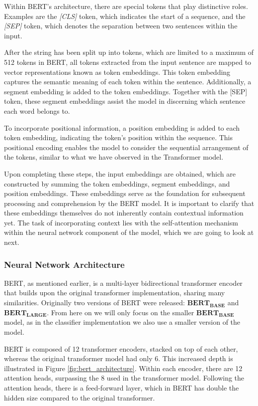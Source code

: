 \documentclass[a4paper,10pt]{report}
\begin{document}
Within BERT's architecture, there are special tokens that play distinctive roles. Examples are the \textit{[CLS]} token, which indicates the start of a sequence, and the \textit{[SEP]} token, which denotes the separation between two sentences within the input.

After the string has been split up into tokens, which are limited to a maximum of 512 tokens in BERT, all tokens extracted from the input sentence are mapped to vector representations known as token embeddings. This token embedding captures the semantic meaning of each token within the sentence. Additionally, a segment embedding is added to the token embeddings. Together with the [SEP] token, these segment embeddings assist the model in discerning which sentence each word belongs to.

To incorporate positional information, a position embedding is added to each token embedding, indicating the token's position within the sequence. This positional encoding enables the model to consider the sequential arrangement of the tokens, similar to what we have observed in the Transformer model.

Upon completing these steps, the input embeddings are obtained, which are constructed by summing the token embeddings, segment embeddings, and position embeddings. These embeddings serve as the foundation for subsequent processing and comprehension by the BERT model. It is important to clarify that these embeddings themselves do not inherently contain contextual information yet. The task of incorporating context lies with the self-attention mechanism within the neural network component of the model, which we are going to look at next. \cite{bert}

\subsubsection{Neural Network Architecture}
BERT, as mentioned earlier, is a multi-layer bidirectional transformer encoder that builds upon the original transformer implementation, sharing many similarities. Originally two versions of BERT were released: $\mathbf{BERT_{BASE}}$ and $\mathbf{BERT_{LARGE}}$. From here on we will only focus on the smaller $\mathbf{BERT_{BASE}}$ model, as in the classifier implementation we also use a smaller version of the model.

BERT is composed of 12 transformer encoders, stacked on top of each other, whereas the original transformer model had only 6. This increased depth is illustrated in Figure \ref{fig:bert_architecture}. Within each encoder, there are 12 attention heads, surpassing the 8 used in the transformer model. Following the attention heads, there is a feed-forward layer, which in BERT has double the hidden size compared to the original transformer.
\end{document}

